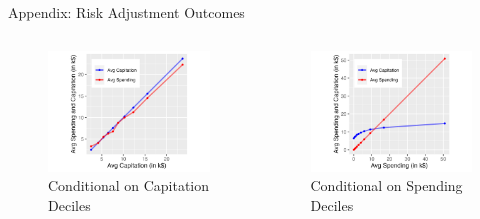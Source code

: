 \documentclass[professionalfonts, aspectratio=169]{beamer}
\begin{document}
\begin{frame}{Appendix: Risk Adjustment Outcomes}
  \begin{columns}
    \begin{column}{0.5\textwidth}
      \begin{figure}
        \centering
        \includegraphics[width=1\textwidth]{figures/images/avg_spending_vs_capitation_by_capitation_deciles.png}
        \caption{Conditional on Capitation Deciles}
      \end{figure}
    \end{column}
    \begin{column}{0.5\textwidth}
      \begin{figure}
        \centering
        \includegraphics[width=1\textwidth]{figures/images/avg_spending_vs_capitation_by_spending_deciles.png}
        \caption{Conditional on Spending Deciles}
      \end{figure}
    \end{column}
    
  \end{columns}
\end{frame}
\end{document}
